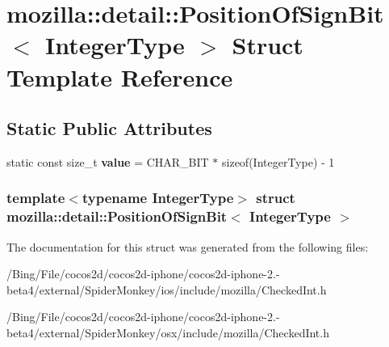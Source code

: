 \hypertarget{structmozilla_1_1detail_1_1_position_of_sign_bit}{\section{mozilla\-:\-:detail\-:\-:Position\-Of\-Sign\-Bit$<$ Integer\-Type $>$ Struct Template Reference}
\label{structmozilla_1_1detail_1_1_position_of_sign_bit}
}
\subsection*{Static Public Attributes}
\begin{DoxyCompactItemize}
\item 
\hypertarget{structmozilla_1_1detail_1_1_position_of_sign_bit_a7cfcca7e140626750ef961eef15ea58a}{static const size\-\_\-t {\bfseries value} = C\-H\-A\-R\-\_\-\-B\-I\-T $\ast$ sizeof(Integer\-Type) -\/ 1}\label{structmozilla_1_1detail_1_1_position_of_sign_bit_a7cfcca7e140626750ef961eef15ea58a}

\end{DoxyCompactItemize}
\subsubsection*{template$<$typename Integer\-Type$>$ struct mozilla\-::detail\-::\-Position\-Of\-Sign\-Bit$<$ Integer\-Type $>$}



The documentation for this struct was generated from the following files\-:\begin{DoxyCompactItemize}
\item 
/\-Bing/\-File/cocos2d/cocos2d-\/iphone/cocos2d-\/iphone-\/2.-\/beta4/external/\-Spider\-Monkey/ios/include/mozilla/Checked\-Int.\-h\item 
/\-Bing/\-File/cocos2d/cocos2d-\/iphone/cocos2d-\/iphone-\/2.-\/beta4/external/\-Spider\-Monkey/osx/include/mozilla/Checked\-Int.\-h\end{DoxyCompactItemize}

